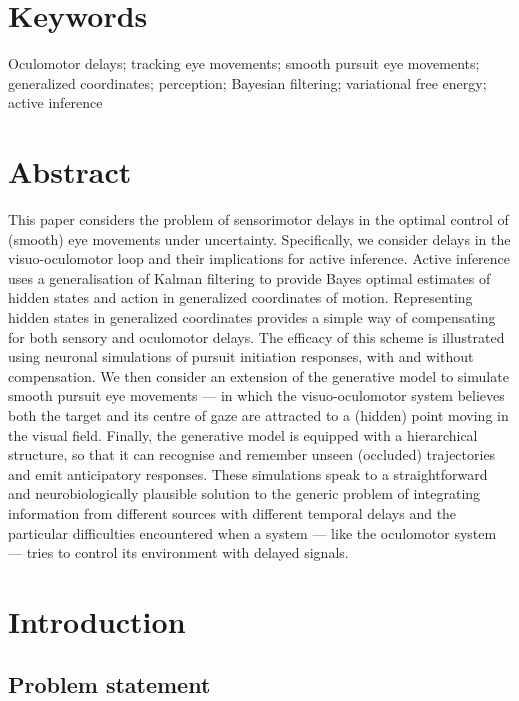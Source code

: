 \documentclass[a4paper]{article} %
\title{\Title}%
\author[1,2]{\AuthorA }%
\author[2]{\AuthorB }
\author[2]{\AuthorC }
\affil[1]{\Address}
\affil[2]{\AddressBis}
\date{}
\newcommand{\Abstract}{This paper considers the problem of sensorimotor delays in the optimal control of (smooth) eye movements under uncertainty. Specifically, we consider delays in the visuo-oculomotor loop and their implications for active inference. Active inference uses a generalisation of Kalman filtering to provide Bayes optimal estimates of hidden states and action in generalized coordinates of motion. Representing hidden states in generalized coordinates provides a simple way of compensating for both sensory and oculomotor delays. The efficacy of this scheme is illustrated using neuronal simulations of pursuit initiation responses, with and without compensation. We then consider an extension of the generative model to simulate smooth pursuit eye movements --- in which the visuo-oculomotor system believes both the target and its centre of gaze are attracted to a (hidden) point moving in the visual field. Finally, the generative model is equipped with a hierarchical structure, so that it can recognise and remember unseen (occluded) trajectories and emit anticipatory responses. These simulations speak to a straightforward and neurobiologically plausible solution to the generic problem of integrating information from different sources with different temporal delays and the particular difficulties encountered when a system --- like the oculomotor system --- tries to control its environment with delayed signals. }%
\newcommand{\Keywords}{Oculomotor delays; tracking eye movements; smooth pursuit eye movements; generalized coordinates; perception; Bayesian filtering; variational free energy; active inference}%
\begin{document}
%
\maketitle%
\section*{Keywords}%
\Keywords
\section*{Abstract}
\Abstract %
\section{Introduction}%
\subsection{Problem statement}%
\end{document}
